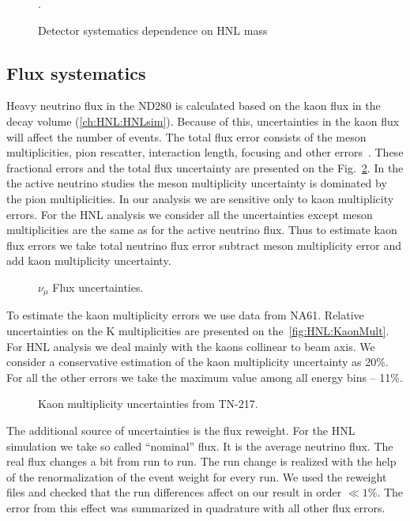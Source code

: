 \documentclass[../main.tex]{subfiles}
\begin{document}
\begin{figure}[!ht]
  \caption{Detector systematics dependence on HNL mass}.
  \label{fig:HNL:sysDimuon}
\end{figure}


\subsection{Flux systematics}

Heavy neutrino flux in the ND280 is calculated based on the kaon flux in the decay volume (\autoref{ch:HNL:HNLsim}). Because of this, uncertainties in the kaon flux will affect the number of events. The total flux error consists of the meson multiplicities, pion rescatter, interaction length, focusing and other errors~\cite{Abe2013}. These fractional errors and the total flux uncertainty are presented on the Fig.~\ref{fig:HNL:FluxError}. In the the active neutrino studies the meson multiplicity uncertainty is dominated by the pion multiplicities. In our analysis we are sensitive only to kaon multiplicity errors. For the HNL analysis we consider all the uncertainties except meson multiplicities are the same as for the active neutrino flux. Thus to estimate kaon flux errors we take total neutrino flux error subtract meson multiplicity error and add kaon multiplicity uncertainty.

\begin{figure}[!ht]
  \caption{$\nu_\mu$ Flux uncertainties.}
  \label{fig:HNL:FluxError}
\end{figure}

To estimate the kaon multiplicity errors we use data from NA61. Relative uncertainties on the K multiplicities are presented on the~\autoref{fig:HNL:KaonMult}. For HNL analysis we deal mainly with the kaons collinear to beam axis. We consider a conservative estimation of the kaon multiplicity uncertainty as 20\%. For all the other errors we take the maximum value among all energy bins -- 11\%.

\begin{figure}[!ht]
  \caption{Kaon multiplicity uncertainties from TN-217.}
  \label{fig:HNL:KaonMult}
\end{figure}

The additional source of uncertainties is the flux reweight. For the HNL simulation we take so called ``nominal'' flux. It is the average neutrino flux. The real flux changes a bit from run to run. The run change is realized with the help of the renormalization of the event weight for every run. We used the reweight files and checked that the run differences affect on our result in order $\ll1\%$. The error from this effect was summarized in quadrature with all other flux errors.
\end{document}
